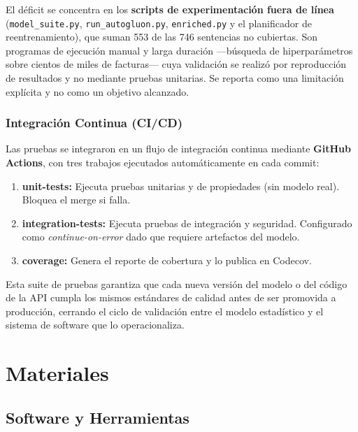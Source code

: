 \documentclass[12pt,letterpaper]{report}
\begin{document}
El déficit se concentra en los \textbf{scripts de experimentación fuera de línea}
(\texttt{model\_suite.py}, \texttt{run\_autogluon.py}, \texttt{enriched.py} y el
planificador de reentrenamiento), que suman 553 de las 746 sentencias no cubiertas.
Son programas de ejecución manual y larga duración —búsqueda de hiperparámetros sobre
cientos de miles de facturas— cuya validación se realizó por reproducción de resultados
y no mediante pruebas unitarias. Se reporta como una limitación explícita y no como un
objetivo alcanzado.

\subsubsection{Integración Continua (CI/CD)}

Las pruebas se integraron en un flujo de integración continua mediante \textbf{GitHub Actions}, con tres trabajos ejecutados automáticamente en cada commit:

\begin{enumerate}
    \item \textbf{unit-tests:} Ejecuta pruebas unitarias y de propiedades (sin modelo real). Bloquea el merge si falla.
    \item \textbf{integration-tests:} Ejecuta pruebas de integración y seguridad. Configurado como \textit{continue-on-error} dado que requiere artefactos del modelo.
    \item \textbf{coverage:} Genera el reporte de cobertura y lo publica en Codecov.
\end{enumerate}

Esta suite de pruebas garantiza que cada nueva versión del modelo o del código de la API cumpla los mismos estándares de calidad antes de ser promovida a producción, cerrando el ciclo de validación entre el modelo estadístico y el sistema de software que lo operacionaliza.

\section{Materiales}

\subsection{Software y Herramientas}
\end{document}
